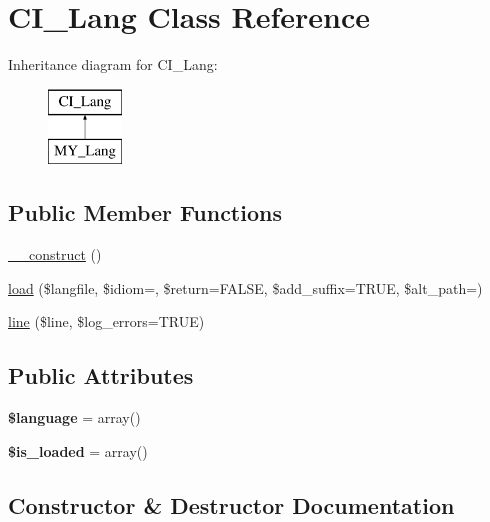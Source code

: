 \hypertarget{class_c_i___lang}{}\section{C\+I\+\_\+\+Lang Class Reference}
\label{class_c_i___lang}
Inheritance diagram for C\+I\+\_\+\+Lang\+:\begin{figure}[H]
\begin{center}
\leavevmode
\includegraphics[height=2.000000cm]{class_c_i___lang}
\end{center}
\end{figure}
\subsection*{Public Member Functions}
\begin{DoxyCompactItemize}
\item 
\mbox{\hyperlink{class_c_i___lang_ae5a0a2179e31917ecb0c374072e3c8d2}{\+\_\+\+\_\+construct}} ()
\item 
\mbox{\hyperlink{class_c_i___lang_a02e4ac5258af38b15e09b23fd2185e8f}{load}} (\$langfile, \$idiom=\textquotesingle{}\textquotesingle{}, \$return=F\+A\+L\+SE, \$add\+\_\+suffix=T\+R\+UE, \$alt\+\_\+path=\textquotesingle{}\textquotesingle{})
\item 
\mbox{\hyperlink{class_c_i___lang_af891ebde0d6c16106e425736a1b8947d}{line}} (\$line, \$log\+\_\+errors=T\+R\+UE)
\end{DoxyCompactItemize}
\subsection*{Public Attributes}
\begin{DoxyCompactItemize}
\item 
\mbox{\label{class_c_i___lang_a9df8067ee90b52636e7896a33a351e4c}} 
{\bfseries \$language} = array()
\item 
\mbox{\label{class_c_i___lang_a5e7e64d9e4c0b85ceff3a0ec70498947}} 
{\bfseries \$is\+\_\+loaded} = array()
\end{DoxyCompactItemize}


\subsection{Constructor \& Destructor Documentation}
\mbox{\label{class_c_i___lang_ae5a0a2179e31917ecb0c374072e3c8d2}} 
